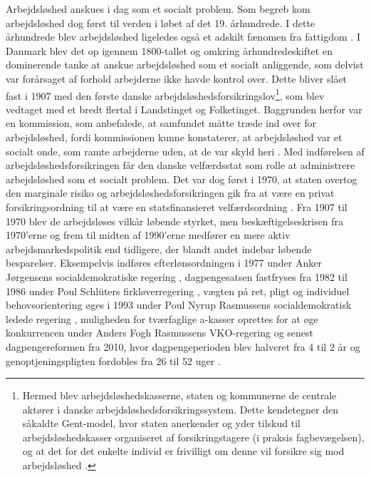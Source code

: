 Arbejdsløshed anskues i dag som et socialt problem. Som begreb kom arbejdsløshed dog først til verden i løbet af det 19. århundrede. I dette århundrede blev arbejdsløshed ligeledes også et adskilt fænomen fra fattigdom \textbf{\parencite[3]{Halvorsen1999}}. I Danmark blev det op igennem 1800-tallet og omkring århundredeskiftet en dominerende tanke at anskue arbejdsløshed som et socialt anliggende, som delvist var forårsaget af forhold arbejderne ikke havde kontrol over. Dette bliver slået fast i 1907 med den første danske arbejdsløshedsforsikringslov\footnote{Hermed blev arbejdsløshedskasserne, staten og kommunerne de centrale aktører i  danske arbejdsløshedsforsikringssystem. Dette kendetegner den såkaldte Gent-model, hvor staten anerkender og yder tilskud til arbejdsløshedskasser organiseret af forsikringstagere (i praksis fagbevægelsen), og at det for det enkelte individ er frivilligt om denne vil forsikre sig mod arbejdsløshed \parencite{Jensen2007a}.}, som blev vedtaget med et bredt flertal i Landstinget og Folketinget. Baggrunden herfor var en kommission, som anbefalede, at samfundet måtte træde ind over for arbejdsløshed, fordi kommissionen kunne konstaterer, at arbejdsløshed var et socialt onde, som ramte arbejderne uden, at de var skyld heri \parencite[69]{Pedersen2007}. Med indførelsen af arbejdsløshedsforsikringen får den danske velfærdsstat som rolle at administrere arbejdsløshed som et socialt problem. Det var dog først i 1970, at staten overtog den marginale risiko og arbejdsløshedsforsikringen gik fra at være en privat forsikringsordning til at være en statsfinansieret velfærdsordning \parencite[83]{Pedersen2007}. Fra 1907 til 1970 blev de arbejdsløses vilkår løbende styrket, men beskæftigelseskrisen fra 1970'erne og frem til midten af 1990'erne medfører en mere aktiv arbejdsmarkedspolitik end tidligere, der blandt andet indebar løbende besparelser. Eksempelvis indføres efterlønsordningen i 1977 under Anker Jørgensens socialdemokratiske regering \parencite[86]{Pedersen2007}, dagpengesatsen fastfryses fra 1982 til 1986 under Poul Schlüters firkløverregering \parencite[88]{Pedersen2007}, vægten på ret, pligt og individuel behovsorientering øges i 1993 under Poul Nyrup Rasmussens socialdemokratisk ledede regering \parencite[92]{Pedersen2007}, muligheden for tværfaglige a-kasser oprettes for at øge konkurrencen under Anders Fogh Rasmussens VKO-regering \parencite[97]{Pedersen2007} og senest dagpengereformen fra 2010, hvor dagpengeperioden blev halveret fra 4 til 2 år og genoptjeningspligten fordobles fra 26 til 52 uger \parencite{lov_dagpenge}. %

